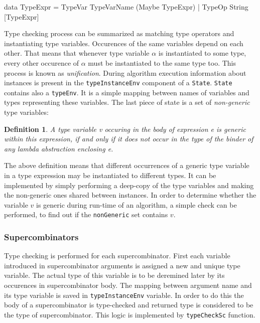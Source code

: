 \documentclass[12pt,a4paper]{report}
\newtheorem{definition}{Definition}[chapter]
\begin{document}
\vspace*{0.2in}
\begin{code}[style=haskell]
  data TypeExpr = TypeVar TypeVarName (Maybe TypeExpr)
                | TypeOp String [TypeExpr]
\end{code}

Type checking process can be summarized as matching type operators and
instantiating type variables. Occurences of the same variables depend on each
other. That means that whenever type variable $\alpha$ is instantiated to some
type, every other occurence of $\alpha$ must be instantiated to the same type
too. This process is known as \textit{unification}. During algorithm execution
information about instances is present in the \texttt{typeInstanceEnv}
component of a \texttt{State}. \texttt{State} contains also a \texttt{typeEnv}.
It is a simple mapping between names of variables and types representing these
variables. The last piece of state is a set of \textit{non-generic} type
variables:

\begin{definition}
  A type variable v occuring in the body of expression e is generic within this
  expression, if and only if it does not occur in the type of the binder of any
  lambda abstraction enclosing e.
\end{definition}

The above definition means that different occurrences of a generic type
variable in a type expression may be instantiated to different types. It can be
implemented by simply performing a deep-copy of the type variables and making
the non-generic ones shared between instances. In order to determine whether
the variable $v$ is generic during run-time of an algorithm, a simple check can be
performed, to find out if the \texttt{nonGeneric} set contains $v$.

\subsubsection{Supercombinators}
Type checking is performed for each supercombinator. First each variable
introduced in supercombinator arguments is assigned a new and unique type
variable. The actual type of this variable is to be deremined later by its
occurences in supercombinator body. The mapping between argument name and its
type variable is saved in \texttt{typeInstanceEnv} variable. In order to do
this the body of a supercombinator is type-checked and returned type is
considered to be the type of supercombinator. This logic is implemented by
\texttt{typeCheckSc} function.
\end{document}
